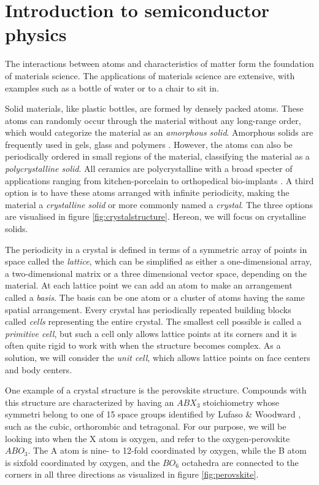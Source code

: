 \section{Introduction to semiconductor physics}

The interactions between atoms and characteristics of matter form the foundation of materials science. The applications of materials science are extensive, with examples such as a bottle of water or to a chair to sit in.

Solid materials, like plastic bottles, are formed by densely packed atoms. These atoms can randomly occur through the material without any long-range order, which would categorize the material as an \textit{amorphous solid}. Amorphous solids are frequently used in gels, glass and polymers \cite{BenStreetman2015}. However, the atoms can also be periodically ordered in small regions of the material, classifying the material as a \textit{polycrystalline solid}. All ceramics are polycrystalline with a broad specter of applications ranging from kitchen-porcelain to orthopedical bio-implants \cite{Renganathan2018}. A third option is to have these atoms arranged with infinite periodicity, making the material a \textit{crystalline solid} or more commonly named a \textit{crystal}. The three options are visualised in figure \ref{fig:crystalstructure}. Hereon, we will focus on crystalline solids.

The periodicity in a crystal is defined in terms of a symmetric array of points in space called the \textit{lattice}, which can be simplified as either a one-dimensional array, a two-dimensional matrix or a three dimensional vector space, depending on the material. At each lattice point we can add an atom to make an arrangement called a \textit{basis}. The basis can be one atom or a cluster of atoms having the same spatial arrangement. Every crystal has periodically repeated building blocks called \textit{cells} representing the entire crystal. The smallest cell possible is called a \textit{primitive cell}, but such a cell only allows lattice points at its corners and it is often quite rigid to work with when the structure becomes complex. As a solution, we will consider the \textit{unit cell}, which allows lattice points on face centers and body centers.

\newpage



\newpage
\noindent One example of a crystal structure is the perovskite structure. Compounds with this structure are characterized by having an $ABX_3$ stoichiometry whose symmetri belong to one of 15 space groups identified by Lufaso \& Woodward \cite{Lufaso2001}, such as the cubic, orthorombic and tetragonal. For our purpose, we will be looking into when the X atom is oxygen, and refer to the oxygen-perovskite $ABO_3$. The A atom is nine- to 12-fold coordinated by oxygen, while the B atom is sixfold coordinated by oxygen, and the $BO_6$ octahedra are connected to the corners in all three directions as visualized in figure \ref{fig:perovskite}.


